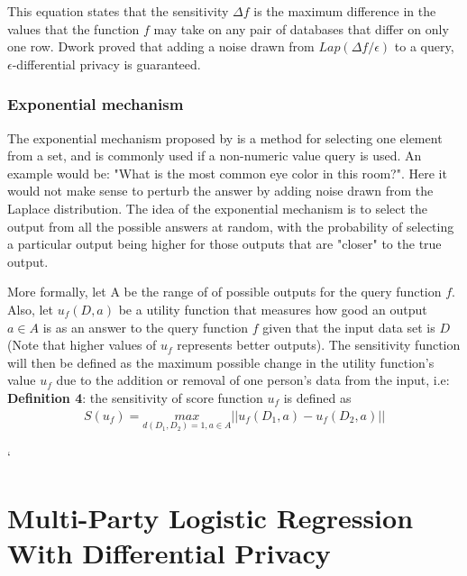 This equation states that the sensitivity $\Delta f$ is the maximum difference in the values that the function $f$ may take on any pair of databases that differ on only one row. Dwork proved that adding a noise drawn from $Lap(\Delta f/\epsilon)$ to a query, $\epsilon$-differential privacy is guaranteed\citep{dwork2013algorithmic}. 


\subsubsection{Exponential mechanism} \label{sec:Exponential Mechanism}
The exponential mechanism proposed by \cite{mcsherry2007} is a method for selecting one element from a set, and is commonly used if a non-numeric value query is used. An example would be: "What is the most common eye color in this room?". Here it would not make sense to perturb the answer by adding noise drawn from the Laplace distribution. The idea of the exponential mechanism is to select the output from all the possible answers at random, with the probability of selecting a particular output being higher for those outputs that are "closer" to the true output. 

More formally, let A be the range of of possible outputs for the query function $f$. Also, let $u_f(D,a)$ be a utility function that measures how good an output $a\in A$ is as an answer to the query function $f$ given that the input data set is $D$ (Note that higher values of $u_f$ represents better outputs). The sensitivity function will then be defined as the maximum possible change in the utility function's value $u_f$ due to the addition or removal of one person's data from the input, i.e: \newline
\textbf{Definition 4}: the sensitivity of score function $u_f$ is defined as
\begin{eqnarray} \label{ExpoMecDef}
S(u_f) = \underset{d(D_1,D_2)=1,a\in A}{max}||u_f(D_1, a)-u_f(D_2,a)||
 \end{eqnarray}
 
 `
\section{Multi-Party Logistic Regression With Differential Privacy}
\label{sec:logistic_regression}
 
